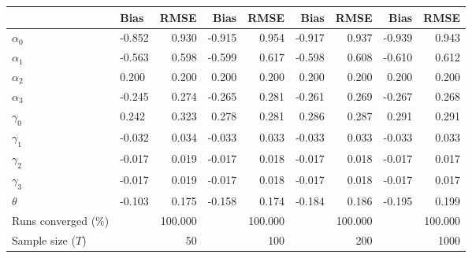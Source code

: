 
\begin{tabular}[t]{llrrrrrrr}
\toprule
  & Bias & RMSE & Bias & RMSE & Bias & RMSE & Bias & RMSE\\
\midrule
$\alpha_{0}$ & -0.852 & 0.930 & -0.915 & 0.954 & -0.917 & 0.937 & -0.939 & 0.943\\
$\alpha_{1}$ & -0.563 & 0.598 & -0.599 & 0.617 & -0.598 & 0.608 & -0.610 & 0.612\\
$\alpha_{2}$ & 0.200 & 0.200 & 0.200 & 0.200 & 0.200 & 0.200 & 0.200 & 0.200\\
$\alpha_{3}$ & -0.245 & 0.274 & -0.265 & 0.281 & -0.261 & 0.269 & -0.267 & 0.268\\
$\gamma_{0}$ & 0.242 & 0.323 & 0.278 & 0.281 & 0.286 & 0.287 & 0.291 & 0.291\\
$\gamma_{1}$ & -0.032 & 0.034 & -0.033 & 0.033 & -0.033 & 0.033 & -0.033 & 0.033\\
$\gamma_{2}$ & -0.017 & 0.019 & -0.017 & 0.018 & -0.017 & 0.018 & -0.017 & 0.017\\
$\gamma_{3}$ & -0.017 & 0.019 & -0.017 & 0.018 & -0.017 & 0.018 & -0.017 & 0.017\\
$\theta$ & -0.103 & 0.175 & -0.158 & 0.174 & -0.184 & 0.186 & -0.195 & 0.199\\
Runs converged (\%) &  & 100.000 &  & 100.000 &  & 100.000 &  & 100.000\\
Sample size ($T$) &  & 50 &  & 100 &  & 200 &  & 1000\\
\bottomrule
\end{tabular}
